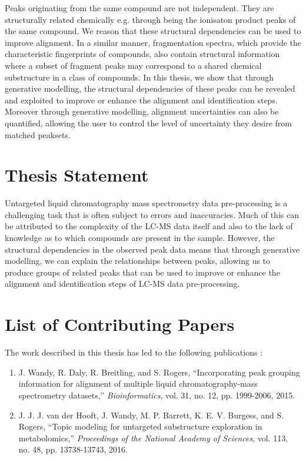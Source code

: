 Peaks originating from the same compound are not independent. They are structurally related chemically e.g. through being the ionisaton product peaks of the same compound. We reason that these structural dependencies can be used to improve alignment. In a similar manner, fragmentation spectra, which provide the characteristic fingerprints of compounds, also contain structural information where a subset of fragment peaks may correspond to a shared chemical substructure in a class of compounds. In this thesis, we show that through generative modelling, the structural dependencies of these peaks can be revealed and exploited to improve or enhance the alignment and identification steps. Moreover through generative modelling, alignment uncertainties can also be quantified, allowing the user to control the level of uncertainty they desire from matched peaksets.

\section{Thesis Statement\label{sub:thesis-statement}}

Untargeted liquid chromatography mass spectrometry data pre-processing is a challenging task that is often subject to errors and inaccuracies. Much of this can be attributed to the complexity of the LC-MS data itself and also to the lack of knowledge as to which compounds are present in the sample. However, the structural dependencies in the observed peak data means that through generative modelling, we can explain the relationships between peaks, allowing us to produce groups of related peaks that can be used to improve or enhance the alignment and identification steps of LC-MS data pre-processing.

\section{List of Contributing Papers}

The work described in this thesis has led to the following publications \cite{wandy2015incorporating, vanderHooft29112016}:

\begin{enumerate}
\item J. Wandy, R. Daly, R. Breitling, and S. Rogers, ``Incorporating peak grouping information for alignment of multiple liquid chromatography-mass spectrometry datasets,'' \textit{Bioinformatics}, vol. 31, no. 12, pp. 1999-2006, 2015.
\item J. J. J. van der Hooft, J. Wandy, M. P. Barrett, K. E. V. Burgess, and S. Rogers, ``Topic modeling for untargeted substructure exploration in metabolomics,'' \textit{Proceedings of the National Academy of Sciences}, vol. 113, no. 48, pp. 13738-13743, 2016.
\end{enumerate}

